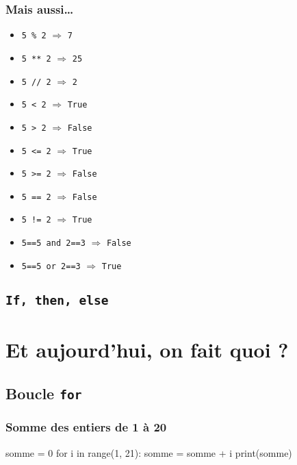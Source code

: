 \documentclass{beamer}
\begin{document}
\begin{frame}
\frametitle{Mais aussi\dots}

\begin{itemize}%
   \item<1-> \texttt{5 \% 2} $\Longrightarrow$ \pause \texttt{7} \pause
   \item<2-> \texttt{5 ** 2} $\Longrightarrow$ \pause \texttt{25} \pause
   \item<3-> \texttt{5 // 2} $\Longrightarrow$ \pause \texttt{2} \pause
   \item<4-> \texttt{5 < 2} $\Longrightarrow$ \pause \texttt{True} \pause
   \item<5-> \texttt{5 > 2} $\Longrightarrow$ \pause \texttt{False} \pause
   \item<6-> \texttt{5 <= 2} $\Longrightarrow$ \pause \texttt{True} \pause
   \item<7-> \texttt{5 >= 2} $\Longrightarrow$ \pause \texttt{False} \pause
   \item<8-> \texttt{5 == 2} $\Longrightarrow$ \pause \texttt{False} \pause
   \item<9-> \texttt{5 != 2} $\Longrightarrow$ \pause \texttt{True} \pause
   \item<10-> \texttt{5==5 and 2==3} $\Longrightarrow$ \pause \texttt{False} \pause
   \item<11-> \texttt{5==5 or 2==3} $\Longrightarrow$ \pause \texttt{True}
\end{itemize}
\end{frame}

   \subsection{\texttt{If, then, else}}\label{subsec:if-then-else}



\section{Et aujourd'hui, on fait quoi ?}\label{sec:et-aujourdhui-on-fait-quoi}
   \subsection{Boucle \texttt{for}}\label{subsec:boucle-for}
\begin{frame}[fragile]
   \frametitle{Somme des entiers de 1 à 20}
   \begin{pyverbatim}
            somme = 0
            for i in range(1, 21):
               somme = somme + i
            print(somme)
   \end{pyverbatim}
\end{frame}
\end{document}

